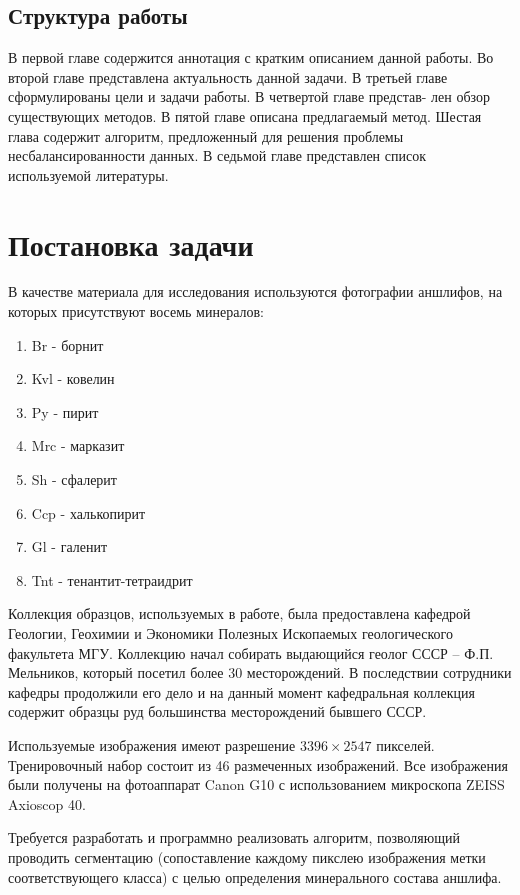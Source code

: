 \subsection{Структура работы}
В первой главе содержится аннотация с кратким описанием данной работы. Во второй главе представлена актуальность данной задачи. В третьей главе сформулированы цели и задачи работы. В четвертой главе представ- лен обзор существующих методов. В пятой главе описана предлагаемый метод. Шестая глава содержит алгоритм, предложенный для решения проблемы несбалансированности данных. В седьмой главе представлен список используемой литературы.

\newpage
\section{Постановка задачи}
В качестве материала для исследования используются фотографии аншлифов, на которых присутствуют восемь минералов:
\begin{enumerate}[nosep]
    \item Br - борнит
    \item Kvl - ковелин
    \item Py - пирит
    \item Mrc - марказит
    \item Sh - сфалерит
    \item Ccp - халькопирит
    \item Gl - галенит
    \item Tnt - тенантит-тетраидрит
\end{enumerate}
\par
Коллекция образцов, используемых в работе, была предоставлена кафедрой Геологии,
Геохимии и Экономики Полезных Ископаемых геологического факультета МГУ.
Коллекцию начал собирать выдающийся геолог СССР – Ф.П. Мельников, который посетил
более 30 месторождений. В последствии сотрудники кафедры продолжили его дело и на
данный момент кафедральная коллекция содержит образцы руд большинства
месторождений бывшего СССР. 
\par Используемые изображения имеют разрешение $3396 \times 2547$ пикселей. Тренировочный набор состоит из 46 размеченных изображений. Все изображения были получены на фотоаппарат Canon G10 с использованием микроскопа ZEISS Axioscop 40.
\par
Требуется разработать и программно реализовать алгоритм, позволяющий проводить сегментацию (сопоставление каждому пикслею изображения метки соответствующего класса) с целью определения минерального состава аншлифа. 
